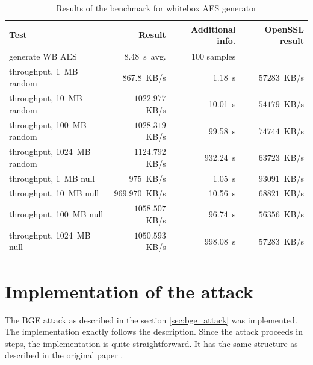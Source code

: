 \documentclass[11pt,oneside,final]{fithesis2}
\begin{document}
    \begin{table}[!htb]
    \begin{center}
    \begin{tabular}{ | l | r | r | r | }
	\hline
	Test                      & Result              &  Additional info.  & OpenSSL result             \\ \hline \hline
	generate WB AES           & 8.48~s~avg.         &  100 samples       &                             \\ \hline
	
	throughput, 1~MB    random   & $867.8$~KB/s     &  1.18~s            & $57283$~KB/s              \\ \hline
	throughput, 10~MB   random   & $1022.977$~KB/s  &  10.01~s           & $54179$~KB/s               \\ \hline
	throughput, 100~MB  random   & $1028.319$~KB/s  &  99.58~s           & $74744$~KB/s               \\ \hline
	throughput, 1024~MB random   & $1124.792$~KB/s  &  932.24~s          & $63723$~KB/s               \\ \hline
	
	throughput, 1~MB null       & $975$~KB/s        &  1.05~s            & $93091$~KB/s               \\ \hline
	throughput, 10~MB null      & $969.970$~KB/s    &  10.56~s           & $68821$~KB/s               \\ \hline
	throughput, 100~MB null     & $1058.507$~KB/s   &  96.74~s           & $56356$~KB/s               \\ \hline
	throughput, 1024~MB null    & $1050.593$~KB/s  &  998.08~s           & $57283$~KB/s               \\ \hline
    \end{tabular}
    \caption{Results of the benchmark for whitebox AES generator}
    \label{tbl:results_scheme_implementation}
    \end{center} 
    \end{table}
    

    \section{Implementation of the attack}
    The BGE attack as described in the section \ref{sec:bge_attack} was implemented. The implementation exactly follows the description. Since
    the attack proceeds in steps, the implementation is quite straightforward. It has the same structure as described in the original paper \citep{Billet:2004:CWB:2080787.2080809}.
    
\end{document}
